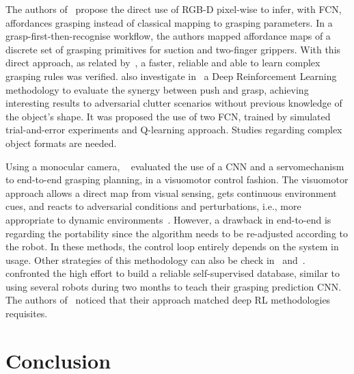 

The authors of~\cite{Zeng2019} propose the direct use of RGB-D pixel-wise to infer, with \ac{FCN}, affordances grasping instead of classical mapping to grasping parameters. In a grasp-first-then-recognise workflow, the authors mapped affordance maps of a discrete set of grasping primitives for suction and two-finger grippers. With this direct approach, as related by~\cite{Zeng2019}, a faster, reliable and able to learn complex grasping rules was verified. \citeauthor{Zeng2018} also investigate in~\cite{Zeng2018} a Deep Reinforcement Learning methodology to evaluate the synergy between push and grasp, achieving interesting results to adversarial clutter scenarios without previous knowledge of the object's shape. It was proposed the use of two \ac{FCN}, trained by simulated trial-and-error experiments and Q-learning approach. Studies regarding complex object formats are needed.

Using a monocular camera, \citeauthor{Levine2018}~\cite{Levine2018} evaluated the use of a \ac{CNN} and a servomechanism to end-to-end grasping planning, in a visuomotor control fashion. The visuomotor approach allows a direct map from visual sensing, gets continuous environment cues, and reacts to adversarial conditions and perturbations, i.e., more appropriate to dynamic environments~\cite{morrison2020learning}. However, a drawback in end-to-end is regarding the portability since the algorithm needs to be re-adjusted according to the robot. In these methods, the control loop entirely depends on the system in usage. Other strategies of this methodology can also be check in~\cite{james2017transferring} and~\cite{viereck2017learning}. \citeauthor{Levine2018}~\cite{Levine2018} confronted the high effort to build a reliable self-supervised database, similar to~\cite{Pinto2015} using several robots during two months to teach their grasping prediction \ac{CNN}. The authors of~\cite{Pinto2015,Levine2018} noticed that their approach matched deep \ac{RL} methodologies requisites. %

\section{Conclusion}
\label{cap2:related_work:sec:grasping_approaches:subsec:conclusion}

